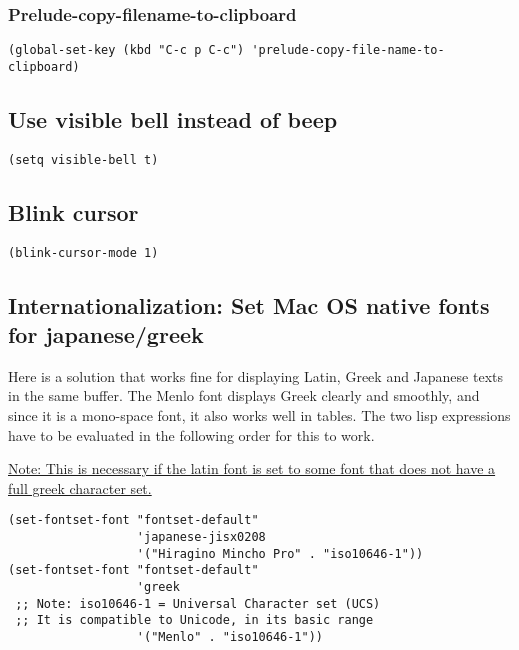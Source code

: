 \documentclass[nofonts]{tufte-handout}
\begin{document}
\subsubsection{Prelude-copy-filename-to-clipboard}
\label{sec-1-3-2}

\begin{verbatim}
(global-set-key (kbd "C-c p C-c") 'prelude-copy-file-name-to-clipboard)
\end{verbatim}

\subsection{Use visible bell instead of beep}
\label{sec-1-4}

\begin{verbatim}
(setq visible-bell t)
\end{verbatim}


\subsection{Blink cursor}
\label{sec-1-5}

\begin{verbatim}
(blink-cursor-mode 1)
\end{verbatim}

\subsection{Internationalization: Set Mac OS native fonts for japanese/greek}
\label{sec-1-6}

Here is a solution that works fine for displaying Latin, Greek and Japanese texts in the same buffer.  The Menlo font displays Greek clearly and smoothly, and since it is a mono-space font, it also works well in tables.  The two lisp expressions have to be evaluated in the following order for this to work.

\uline{Note: This is necessary if the latin font is set to some font that does not have a full greek character set.}

\begin{verbatim}
(set-fontset-font "fontset-default"
                  'japanese-jisx0208
                  '("Hiragino Mincho Pro" . "iso10646-1"))
(set-fontset-font "fontset-default"
                  'greek
 ;; Note: iso10646-1 = Universal Character set (UCS)
 ;; It is compatible to Unicode, in its basic range
                  '("Menlo" . "iso10646-1"))
\end{verbatim}
\end{document}
